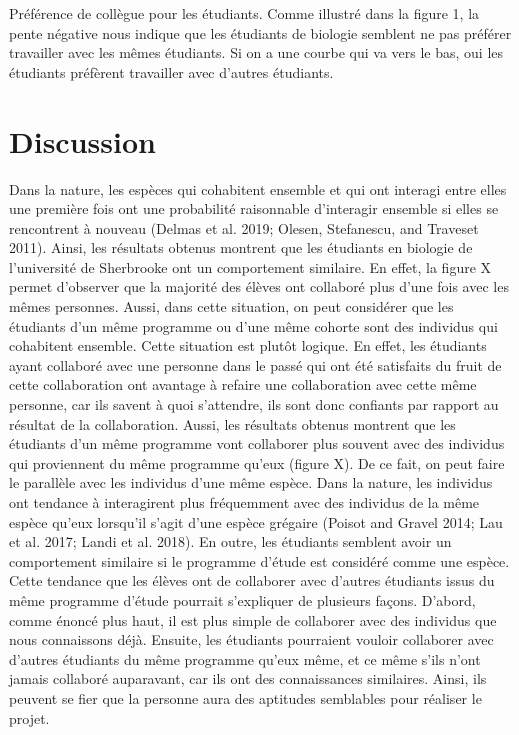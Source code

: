 \documentclass[9pt,twocolumn,twoside,]{pnas-new}
\begin{document}
Préférence de collègue pour les étudiants. Comme illustré dans la figure
1, la pente négative nous indique que les étudiants de biologie semblent
ne pas préférer travailler avec les mêmes étudiants. Si on a une courbe
qui va vers le bas, oui les étudiants préfèrent travailler avec d'autres
étudiants.

\hypertarget{discussion}{%
\section{Discussion}\label{discussion}}

Dans la nature, les espèces qui cohabitent ensemble et qui ont interagi
entre elles une première fois ont une probabilité raisonnable
d'interagir ensemble si elles se rencontrent à nouveau (Delmas et al.
2019; Olesen, Stefanescu, and Traveset 2011). Ainsi, les résultats
obtenus montrent que les étudiants en biologie de l'université de
Sherbrooke ont un comportement similaire. En effet, la figure X permet
d'observer que la majorité des élèves ont collaboré plus d'une fois avec
les mêmes personnes. Aussi, dans cette situation, on peut considérer que
les étudiants d'un même programme ou d'une même cohorte sont des
individus qui cohabitent ensemble. Cette situation est plutôt logique.
En effet, les étudiants ayant collaboré avec une personne dans le passé
qui ont été satisfaits du fruit de cette collaboration ont avantage à
refaire une collaboration avec cette même personne, car ils savent à
quoi s'attendre, ils sont donc confiants par rapport au résultat de la
collaboration. Aussi, les résultats obtenus montrent que les étudiants
d'un même programme vont collaborer plus souvent avec des individus qui
proviennent du même programme qu'eux (figure X). De ce fait, on peut
faire le parallèle avec les individus d'une même espèce. Dans la nature,
les individus ont tendance à interagirent plus fréquemment avec des
individus de la même espèce qu'eux lorsqu'il s'agit d'une espèce
grégaire (Poisot and Gravel 2014; Lau et al. 2017; Landi et al. 2018).
En outre, les étudiants semblent avoir un comportement similaire si le
programme d'étude est considéré comme une espèce. Cette tendance que les
élèves ont de collaborer avec d'autres étudiants issus du même programme
d'étude pourrait s'expliquer de plusieurs façons. D'abord, comme énoncé
plus haut, il est plus simple de collaborer avec des individus que nous
connaissons déjà. Ensuite, les étudiants pourraient vouloir collaborer
avec d'autres étudiants du même programme qu'eux même, et ce même s'ils
n'ont jamais collaboré auparavant, car ils ont des connaissances
similaires. Ainsi, ils peuvent se fier que la personne aura des
aptitudes semblables pour réaliser le projet.
\end{document}
